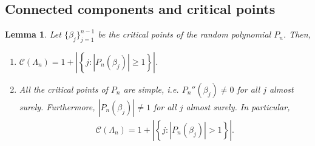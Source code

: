 \documentclass[9pt,a4paper,reqno]{amsart}
\theoremstyle{mine}
\newtheorem{Lemma}[thm]{Lemma}
\theoremstyle{definition}
\theoremstyle{remark}
\begin{document}
\subsection{Connected components and critical points}
\begin{Lemma}\label{components=critical}
Let $\{\beta_j\}_{j=1}^{n-1}$ be the critical points of the random polynomial $P_n$. Then,
\begin{enumerate}[label=(\alph*)]
    \item $\mathscr{C}(\Lambda_n)= 1+ \left|\left\{ j: |P_n(\beta_j)| \geq 1\right \}\right|$. 
    
    \item All the critical points of $P_n$ are simple, i.e. $P_n''(\beta_j) \neq 0$ for all $j$ almost surely. Furthermore, $|P_n(\beta_j)| \neq 1 $ for all $j$  almost surely. In particular, 
    \begin{align*}
           \mathscr{C}(\Lambda_n)= 1+ \left|\left\{ j: |P_n(\beta_j)| > 1\right \}\right|. 
    \end{align*}
\end{enumerate}
\end{Lemma}
\end{document}
